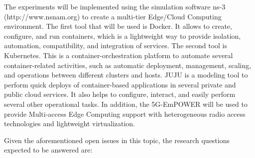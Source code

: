The experiments will be implemented using the simulation software ns-3 (http://www.nsnam.org) to create a multi-tier Edge/Cloud Computing environment. 
The first tool that will be used is Docker. It allows to create, configure, and run containers, which is a lightweight way to provide isolation, automation, compatibility, and integration of services. The second tool is Kubernetes. This is a container-orchestration platform to automate several container-related activities, such as automatic deployment, management, scaling, and operations between different clusters and hosts. JUJU is a modeling tool to perform quick deploys of container-based applications in several private and public cloud services. It also helps to configure, interact, and easily perform several other operational tasks. In addition, the 5G-EmPOWER will be used to provide Multi-access Edge Computing support with heterogeneous radio access technologies and lightweight virtualization.

Given the aforementioned open issues in this topic, the research questions expected to be answered are:





